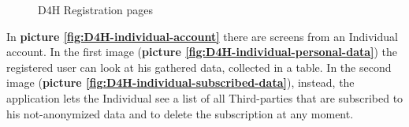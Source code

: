 \begin{figure}[H]
  \centering
  
  \caption{D4H Registration pages}
  \label{fig:D4H-registration}
\end{figure}

In \textbf{picture \ref{fig:D4H-individual-account}} there are screens from an Individual account. In the first image (\textbf{picture \ref{fig:D4H-individual-personal-data}}) the registered user can look at his gathered data, collected in a table. In the second image (\textbf{picture \ref{fig:D4H-individual-subscribed-data}}), instead, the application lets the Individual see a list of all Third-parties that are subscribed to his not-anonymized data and to delete the subscription at any moment.

